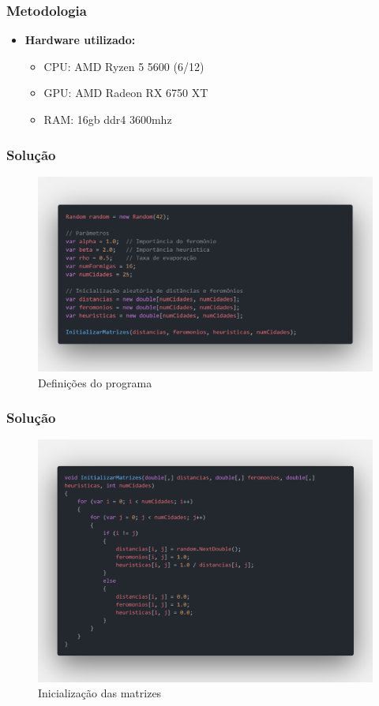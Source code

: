 \documentclass{beamer}
\begin{document}
	\begin{frame}
		\frametitle{Metodologia}
		\begin{itemize}
			\item \textbf{Hardware utilizado:}
			\begin{itemize}
				\item CPU: AMD Ryzen 5 5600 (6/12)
				\item GPU: AMD Radeon RX 6750 XT
				\item RAM: 16gb ddr4 3600mhz
			\end{itemize}
		\end{itemize}
	\end{frame}
	
	\begin{frame}
		\frametitle{Solução}
		\begin{figure}
			\centering
			\includegraphics[width=1\linewidth]{code definition.png} %
			\caption{Definições do programa}
		\end{figure}
	\end{frame}
	
	\begin{frame}
		\frametitle{Solução}
		\begin{figure}
			\centering
			\includegraphics[width=.8\linewidth]{code initialization.png} %
			\caption{Inicialização das matrizes}
		\end{figure}
	\end{frame}
	
\end{document}
